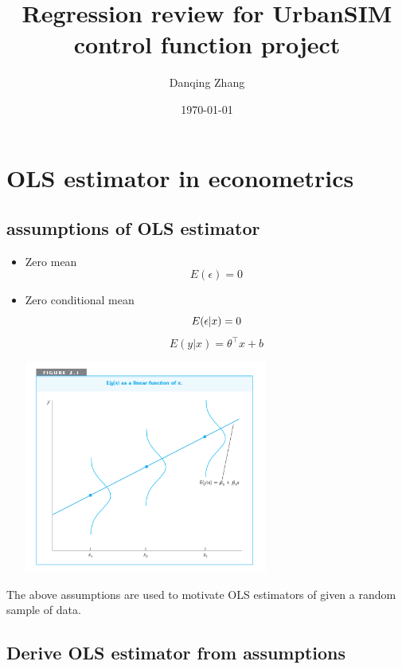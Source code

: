 \documentclass[a4paper,10pt]{article}
\title{Regression review for UrbanSIM control function project}
\author{Danqing Zhang}
\date{\today}
\newcommand{\tran}{^{\top}}
\begin{document}
\maketitle

\tableofcontents







\section{OLS estimator in econometrics \cite{wooldridge2015introductory}}
\subsection{assumptions of OLS estimator}
\begin{itemize}
    \item {Zero mean}
    \begin{equation}
    E(\epsilon)=0
\end{equation}
    \item{Zero conditional mean}
\begin{equation}
E(\epsilon|x)=0\\
\end{equation}
\begin{equation}
E(y|x)=\theta\tran x +b
\end{equation}

\begin{center}

    \includegraphics[width=8cm]{5.png}
\end{center}

\end{itemize}
The above assumptions are used to motivate OLS estimators of given a random sample of data. 

\subsection{Derive OLS estimator from assumptions}
\end{document}
